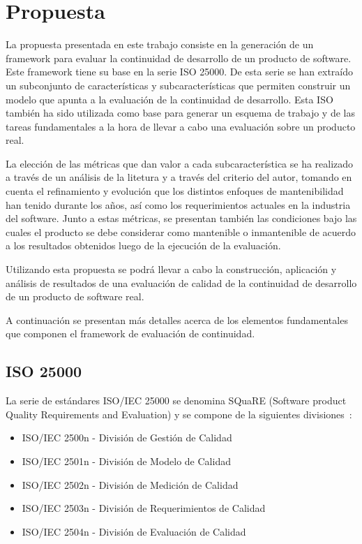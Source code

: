 \chapter{Propuesta}
\label{chap:propuesta}
La propuesta presentada en este trabajo consiste en la generación de un framework
para evaluar la continuidad de desarrollo de un producto de software. Este
framework tiene su base en la serie ISO 25000. De esta serie se han extraído un 
subconjunto de características y subcaracterísticas
que permiten construir un modelo que apunta a la evaluación de la continuidad de desarrollo.
Esta ISO también ha sido utilizada como base para generar un esquema de trabajo y de
las tareas fundamentales a la hora de llevar a cabo una evaluación sobre un producto real.

La elección de las métricas que dan valor a cada subcaracterística se ha realizado a través
de un análisis de la litetura y a través del criterio del autor,
tomando en cuenta el refinamiento y evolución que los distintos enfoques 
de mantenibilidad han tenido durante los años, así como los requerimientos actuales
en la industria del software. Junto a estas métricas, se presentan también las condiciones
bajo las cuales el producto se debe considerar como mantenible o inmantenible de acuerdo
a los resultados obtenidos luego de la ejecución de la evaluación.

Utilizando esta propuesta se podrá llevar a cabo la construcción, aplicación y análisis
de resultados de una evaluación de calidad de la continuidad de desarrollo de un producto
de software real.

A continuación se presentan más detalles acerca de los elementos fundamentales que componen
el framework de evaluación de continuidad.


\section{ISO 25000}

La serie de estándares ISO/IEC 25000 se denomina SQuaRE (Software product
Quality Requirements and Evaluation) y se compone de la siguientes divisiones~\cite{25000}:

\begin{itemize}
    \item ISO/IEC 2500n - División de Gestión de Calidad
    \item ISO/IEC 2501n - División de Modelo de Calidad
    \item ISO/IEC 2502n - División de Medición de Calidad
    \item ISO/IEC 2503n - División de Requerimientos de Calidad
    \item ISO/IEC 2504n - División de Evaluación de Calidad
\end{itemize}

